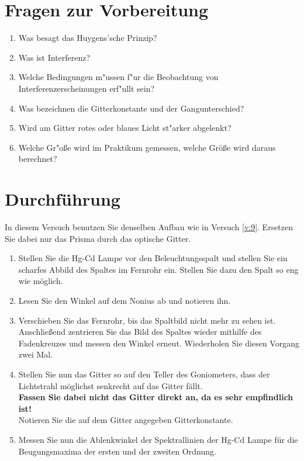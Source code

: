 \section{Fragen zur Vorbereitung}

\begin{enumerate}
 \item Was besagt das Huygens'sche Prinzip?
 \item Was ist Interferenz?
 \item Welche Bedingungen m"ussen f"ur die Beobachtung von Interferenzerscheinungen erf"ullt sein?
 \item Was bezeichnen die Gitterkonstante und der Gangunterschied?
 \item Wird am Gitter rotes oder blaues Licht st"arker abgelenkt?
 \item Welche Gr"o{\ss}e wird im Praktikum gemessen, welche Größe wird daraus berechnet?
\end{enumerate}

\section{Durchführung} 

In diesem Versuch benutzen Sie denselben Aufbau wie in Versuch \ref{v:9}. Ersetzen Sie dabei nur das Prisma durch das optische Gitter.
\begin{enumerate}
	\item Stellen Sie die Hg-Cd Lampe vor den Beleuchtungsspalt und stellen Sie ein scharfes Abbild des Spaltes im Fernrohr ein. Stellen Sie dazu den Spalt so eng wie möglich.
	\item Lesen Sie den Winkel auf dem Nonius ab und notieren ihn. 
	\item Verschieben Sie das Fernrohr, bis das Spaltbild nicht mehr zu sehen ist. Anschließend zentrieren Sie das Bild des Spaltes wieder mithilfe des Fadenkreuzes und messen den Winkel erneut. Wiederholen Sie diesen Vorgang zwei Mal.
	\item Stellen Sie nun das Gitter so auf den Teller des Goniometers, dass der Lichtstrahl möglichst senkrecht auf das Gitter fällt. \\
	\textbf{Fassen Sie dabei nicht das Gitter direkt an, da es sehr empfindlich ist!}\\
	Notieren Sie die auf dem Gitter angegeben Gitterkonstante.
	\item Messen Sie nun die Ablenkwinkel der Spektrallinien der Hg-Cd Lampe für die Beugungsmaxima der ersten  und der zweiten Ordnung. 
\end{enumerate}
